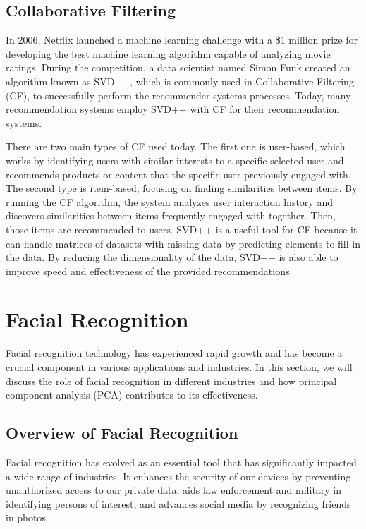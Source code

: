 \documentclass[12pt]{article}
\begin{document}
\subsection{Collaborative Filtering}

In 2006, Netflix launched a machine learning challenge with a \$1 million prize for developing the best machine learning algorithm capable of analyzing movie ratings. During the competition, a data scientist named Simon Funk created an algorithm known as SVD++, which is commonly used in Collaborative Filtering (CF), to successfully perform the recommender systems processes. Today, many recommendation systems employ SVD++ with CF for their recommendation systems.

There are two main types of CF used today. The first one is user-based, which works by identifying users with similar interests to a specific selected user and recommends products or content that the specific user previously engaged with. The second type is item-based, focusing on finding similarities between items. By running the CF algorithm, the system analyzes user interaction history and discovers similarities between items frequently engaged with together. Then, those items are recommended to users.
 SVD++ is a useful tool for CF because it can handle matrices of datasets with missing data by predicting elements to fill in the data. By reducing the dimensionality of the data, SVD++ is also able to improve speed and effectiveness of the provided recommendations.

\section{Facial Recognition}
Facial recognition technology has experienced rapid growth and has become a crucial component in various applications and industries. In this section, we will discuss the role of facial recognition in different industries and how principal component analysis (PCA) contributes to its effectiveness.
\subsection{Overview of Facial Recognition}
Facial recognition has evolved as an essential tool that has significantly impacted a wide range of industries. It enhances the security of our devices by preventing unauthorized access to our private data, aids law enforcement and military in identifying persons of interest, and advances social media by recognizing friends in photos.
\end{document}
